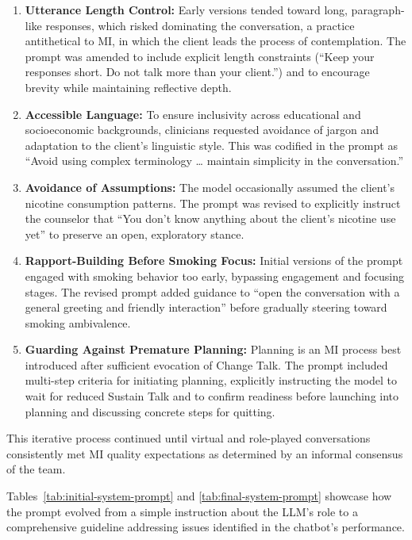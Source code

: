 \begin{enumerate}
    \item \textbf{Utterance Length Control:} Early versions tended toward long, paragraph-like responses, which risked dominating the conversation, a practice antithetical to MI, in which the client leads the process of contemplation. The prompt was amended to include explicit length constraints (``Keep your responses short. Do not talk more than your client.'') and to encourage brevity while maintaining reflective depth.

    \item \textbf{Accessible Language:} To ensure inclusivity across educational and socioeconomic backgrounds, clinicians requested avoidance of jargon and adaptation to the client's linguistic style. This was codified in the prompt as ``Avoid using complex terminology … maintain simplicity in the conversation.''

    \item \textbf{Avoidance of Assumptions:} The model occasionally assumed the client's nicotine consumption patterns. The prompt was revised to explicitly instruct the counselor that ``You don't know anything about the client's nicotine use yet'' to preserve an open, exploratory stance.

    \item \textbf{Rapport-Building Before Smoking Focus:} Initial versions of the prompt engaged with smoking behavior too early, bypassing engagement and focusing stages. The revised prompt added guidance to ``open the conversation with a general greeting and friendly interaction'' before gradually steering toward smoking ambivalence.

    \item \textbf{Guarding Against Premature Planning:} Planning is an MI process best introduced after sufficient evocation of Change Talk. The prompt included multi-step criteria for initiating planning, explicitly instructing the model to wait for reduced Sustain Talk and to confirm readiness before launching into planning and discussing concrete steps for quitting.

    
\end{enumerate}



This iterative process continued until virtual and role-played conversations consistently met MI quality expectations as determined by an informal consensus of the team.


Tables~\ref{tab:initial-system-prompt} and \ref{tab:final-system-prompt} showcase how the prompt evolved from a simple instruction about the LLM's role to a comprehensive guideline addressing issues identified in the chatbot's performance.

